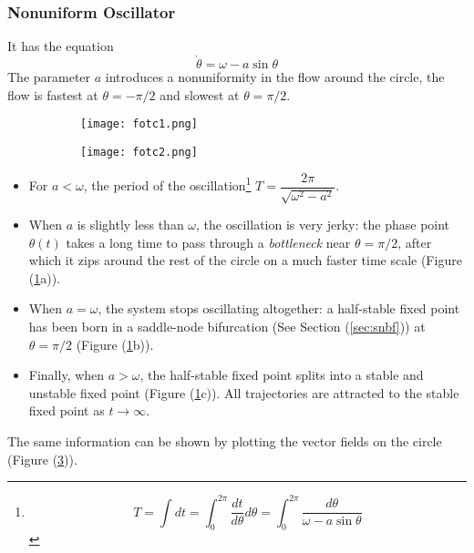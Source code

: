 \subsubsection{Nonuniform Oscillator}{\label{sec:nuo}}
It has the equation
\begin{equation}
  \dot{\theta}=\omega-a\sin\theta
\end{equation}
The parameter $a$ introduces a nonuniformity in the flow around the circle, the flow is fastest at $\theta=-\pi/2$ and slowest at $\theta=\pi/2$.
\begin{figure}[H]
  \centering
  \begin{subfigure}{0.45\linewidth}
    \centering
    \texttt{[image: fotc1.png]}
    \caption{}
    \label{fig:fotc1}
  \end{subfigure}
  \vline
  \begin{subfigure}{0.45\linewidth}
    \centering
    \texttt{[image: fotc2.png]}
    \caption{}
    \label{fig:fotc2}
  \end{subfigure}
  \caption{}
\end{figure}
\begin{itemize}
  \item For $a<\omega$, the period of the oscillation\footnote{$$T=\int dt=\int_0^{2\pi} \frac{dt}{d\theta}d\theta=\int_0^{2\pi}\frac{d\theta}{\omega-a\sin\theta}$$} $T=\dfrac{2\pi}{\sqrt{\omega^2-a^2}}$.
  \item When $a$ is slightly less than $\omega$, the oscillation is very jerky: the phase point $\theta(t)$ takes a long time to pass through a \emph{bottleneck} near $\theta=\pi/2$, after which it zips around the rest of the circle on a much faster time scale (Figure (\ref{fig:fotc1}a)).
  \item When $a=\omega$, the system stops oscillating altogether: a half-stable fixed point has been born in a saddle-node bifurcation (See Section ({\ref{sec:snbf}})) at $\theta=\pi/2$ (Figure (\ref{fig:fotc1}b)).
  \item Finally, when $a>\omega$, the half-stable fixed point splits into a stable and unstable fixed point (Figure (\ref{fig:fotc1}c)).
  All trajectories are attracted to the stable fixed point as $t\rightarrow\infty$.
\end{itemize}
The same information can be shown by plotting the vector fields on the circle (Figure (\ref{fig:fotc2})).
\begin{comment}
\begin{figure}[H]
  \centering
  \texttt{[image: fotc2.png]}
  \caption{}
  \label{fig:fotc2}
\end{figure}
\end{comment}